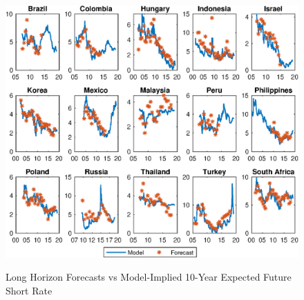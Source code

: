 \documentclass{article}
\begin{document}
	\begin{figure}[tbph]
		\caption{Long Horizon Forecasts vs Model-Implied 10-Year Expected Future Short Rate} \label{fig:bsl_yP_scbp}
		\begin{center}								%
			\begin{minipage}{0.9\linewidth}
				\begin{center}							%
					\includegraphics[trim={0cm 0cm 0cm 0cm},clip,height=0.86\textheight,width=\linewidth]{../Figures/Estimation/bsl_yP_scbp.eps} \\
				\end{center}
			\end{minipage}
		\end{center}
	\end{figure}
\end{document}
